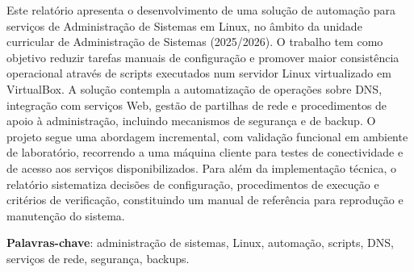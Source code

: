 
Este relatório apresenta o desenvolvimento de uma solução de automação para serviços de Administração de Sistemas em Linux, no âmbito da unidade curricular de Administração de Sistemas (2025/2026). O trabalho tem como objetivo reduzir tarefas manuais de configuração e promover maior consistência operacional através de scripts executados num servidor Linux virtualizado em VirtualBox. A solução contempla a automatização de operações sobre DNS, integração com serviços Web, gestão de partilhas de rede e procedimentos de apoio à administração, incluindo mecanismos de segurança e de backup. O projeto segue uma abordagem incremental, com validação funcional em ambiente de laboratório, recorrendo a uma máquina cliente para testes de conectividade e de acesso aos serviços disponibilizados. Para além da implementação técnica, o relatório sistematiza decisões de configuração, procedimentos de execução e critérios de verificação, constituindo um manual de referência para reprodução e manutenção do sistema.

\textbf{Palavras-chave}: administração de sistemas, Linux, automação, scripts, DNS, serviços de rede, segurança, backups.
